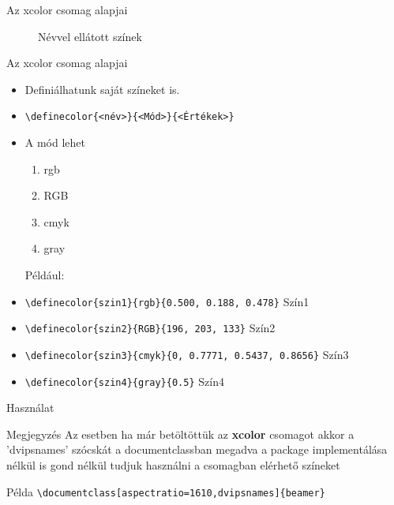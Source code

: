 \documentclass[aspectratio=1610,dvipsnames,xcolor=table]{beamer}
\begin{document}
\begin{frame}[fragile]{Az xcolor csomag alapjai}
\begin{minipage}{0.35\textwidth}
\begin{figure}
                \caption{Névvel ellátott színek}
            \end{figure}
        \end{minipage}
    \end{frame}

    \begin{frame}[fragile]{Az xcolor csomag alapjai}
        \begin{minipage}{0.8\textwidth}
            \begin{itemize}
                \item {}Definiálhatunk saját színeket is.
                \item {}\verb!\definecolor{<név>}{<Mód>}{<Értékek>}!
                \item {}A mód lehet
                \begin{enumerate}
                    \item {}rgb
                    \item {}RGB
                    \item {}cmyk
                    \item {}gray    
                \end{enumerate}
                Például:
                \item {}\verb!\definecolor{szin1}{rgb}{0.500, 0.188, 0.478}! 						\hfill \textcolor{szin1}{Szín1}
                \item {}\verb!\definecolor{szin2}{RGB}{196, 203, 133}! \hfill 					\textcolor{szin2}{Szín2}
                \item {}\verb!\definecolor{szin3}{cmyk}{0, 0.7771, 0.5437, 0.8656}! \hfill \textcolor{szin3}{Szín3}
                \item {}\verb!\definecolor{szin4}{gray}{0.5}! \hfill 								\textcolor{szin4}{Szín4}
            \end{itemize}
                                                        
        \end{minipage} 
        
    \end{frame}
    
  
\begin{frame}[fragile]{Használat}
	
 	\begin{block}{Megjegyzés}
 		Az esetben ha már betöltöttük az \textbf{xcolor} csomagot akkor a 'dvipsnames' 				szócskát a documentclassban megadva a package implementálása nélkül is gond 				nélkül tudjuk használni a csomagban elérhető színeket
	\end{block} 	
	
	\begin{exampleblock}{Példa}
    {
       \verb!\documentclass[aspectratio=1610,dvipsnames]{beamer}!
    }
    \end{exampleblock}
	
	
\end{frame}
\end{document}
